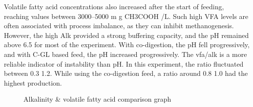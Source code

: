 \documentclass[12pt, a4paper, oneside]{report}
\begin{document}
Volatile fatty acid concentrations also increased after the start of feeding, reaching values between 3000–5000 m g CH3COOH /L. Such high VFA levels are often associated with process imbalance, as they can inhibit methanogenesis. However, the high Alk provided a strong buffering capacity, and the pH remained above 6.5 for most of the experiment. With co-digestion, the pH fell progressively, and with C-GL based feed, the pH increased progressively. The vfa/alk is a more reliable indicator of instability than pH. In this experiment, the ratio fluctuated between 0.3 1.2. While using the co-digestion feed, a ratio around 0.8 1.0 had the highest production.

\begin{figure}[H]
    \centering
    \begingroup
    \endgroup
    \caption{Alkalinity \& volatile fatty acid comparison graph}
    
\end{figure}
\end{document}
